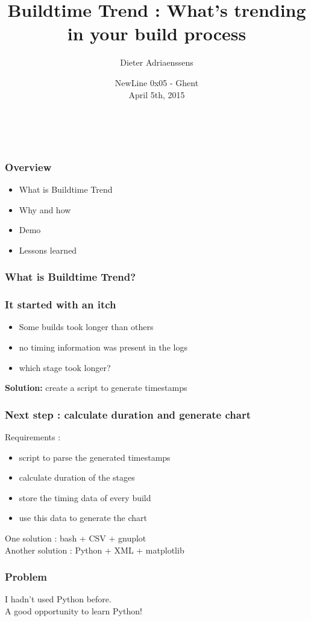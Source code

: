 \documentclass[14pt]{beamer}
\title[Buildtime Trend : What, why and how]{Buildtime Trend : What's trending in your build process}
\author{Dieter Adriaenssens}
\institute[Buildtime Trend]{Buildtime Trend founder, developer - @dcadriaenssens}
\date[NewLine 0x05 5Apr2015]{NewLine 0x05 - Ghent\\
April 5th, 2015}
\begin{document}
  \begin{frame}
    \titlepage
    \vfill
    \begin{center}
      \\[2.5ex]
        {\tiny\CcNote{\CcLongnameByNcSa}}
        \vspace*{-2.5ex}
    \end{center}
  \end{frame}
  \begin{frame}
    \frametitle{Overview}
    \begin{itemize}
      \item What is Buildtime Trend
      \item Why and how
      \item Demo
      \item Lessons learned
    \end{itemize}
  \end{frame}
  \begin{frame}
    \frametitle{What is Buildtime Trend?}
  \end{frame}
  \begin{frame}
    \frametitle{It started with an itch}
    \begin{itemize}
      \item Some builds took longer than others
      \item no timing information was present in the logs
      \item which stage took longer?
    \end{itemize}
    \pause
    \textbf{Solution:} create a script to generate timestamps
  \end{frame}
  \begin{frame}
    \frametitle{Next step : calculate duration and generate chart}
    Requirements :
    \begin{itemize}
      \item script to parse the generated timestamps
      \item calculate duration of the stages
      \item store the timing data of every build
      \item use this data to generate the chart
    \end{itemize}
    \pause
    One solution : bash + CSV + gnuplot\\
    \pause
    Another solution : Python + XML + matplotlib
  \end{frame}
  \begin{frame}
    \frametitle{Problem}
    I hadn't used Python before.\\
    \pause
    A good opportunity to learn Python!
  \end{frame}
\end{document}
